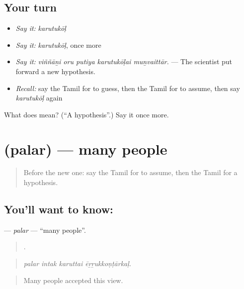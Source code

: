 \subsection*{Your turn}
\begin{itemize}
\raggedright
  \item \emph{Say it:} \emph{karutukōḷ}
  \item \emph{Say it:} \emph{karutukōḷ}, once more
  \item \emph{Say it:} \emph{viññāṉi oru putiya karutukōḷai muṉvaittār.} — The scientist put forward a new hypothesis.
  \item \emph{Recall:} say the Tamil for to guess, then the Tamil for to assume, then say \emph{karutukōḷ} again
\end{itemize}

\begin{tcolorbox}[breakable,colback=teal!4,colframe=teal!35!black,title={Before you move on}]
What does  mean? (\textquotedblleft{}A hypothesis\textquotedblright{}.) Say it once more.
\end{tcolorbox}
\section[\texorpdfstring{\ta{பலர்} (palar)}{பலர் (palar)}]{ (palar) — many people}

\label{lesson:TA-C349-palar}



\begin{quote}
Before the new one: say the Tamil for to assume, then the Tamil for a hypothesis.
\end{quote}

\subsection*{You'll want to know: }
\textbf{} — \emph{palar} — \textquotedblleft{}many people\textquotedblright{}.

\begin{quote}
   .
\end{quote}

\begin{quote}
\emph{palar intak karuttai ēṟṟukkoṇṭārkaḷ.}
\end{quote}

\begin{quote}
Many people accepted this view.
\end{quote}

